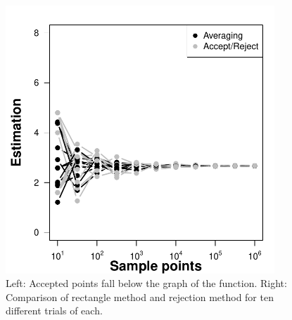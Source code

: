 \documentclass[11pt]{article}
\begin{document}
\begin{figure}[h!]
\begin{minipage}{0.48\textwidth}
\centering
\includegraphics[width=0.9\textwidth]{5_integration/Ns.pdf}
\end{minipage}
\caption{Left: Accepted points fall below the graph of the function. Right: Comparison of rectangle method and rejection method for ten different trials of each.}\label{fig::compare}
\end{figure}
\end{document}
